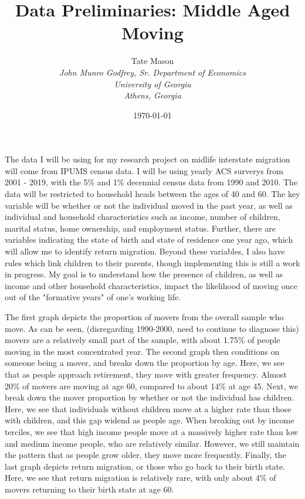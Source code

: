 \documentclass[11pt,a4paper]{article}
\title{Data Preliminaries: Middle Aged Moving}
\author{
    Tate Mason \\
    \textit{John Munro Godfrey, Sr. Department of Economics} \\
    \textit{University of Georgia} \\
    \textit{Athens, Georgia} \\
}
\date{\today}
\begin{document}
\maketitle
\thispagestyle{empty}

\newpage
\setcounter{page}{1}

The data I will be using for my research project on midlife interstate migration will come from IPUMS census data. I will be using yearly ACS surverys from 2001 - 2019, with the 5\% and 1\% decennial 
census data from 1990 and 2010. The data will be restricted to household heads between the ages of 40 and 60. The key variable will be whether or not the individual moved in the past year, as well as
individual and household characteristics such as income, number of children, marital status, home ownership, and employment status. Further, there are variables indicating the state of birth and state of residence one year ago, 
which will allow me to identify return migration. Beyond these variables, I also have rules which link children to their parents, though implementing this is still a work in progress. My goal is to
understand how the presence of children, as well as income and other household characteristics, impact the likelihood of moving once out of the "formative years" of one's working life.

The first graph depicts the proportion of movers from the overall sample who move. As can be seen, (disregarding 1990-2000, need to continue to diagnose this) movers are a relatively small part of the sample, with about 1.75\%
of people moving in the most concentrated year. The second graph then conditions on someone being a mover, and breaks down the proportion by age. Here, we see that as people approach retirement, they move with greater frequency.
Almost 20\% of movers are moving at age 60, compared to about 14\% at age 45. Next, we break down the mover proportion by whether or not the individual has children. Here, we see that individuals without children move at a higher rate than those with children, and this gap
widend as people age. When breaking out by income terciles, we see that high income people move at a massively higher rate than low and medium income people, who are relatively similar. However, we still maintain the pattern that
as people grow older, they move more frequently. Finally, the last graph depicts return migration, or those who go back to their birth state. Here, we see that return migration is relatively rare, with only about 4\% of movers returning to their birth state at age 60.
\end{document}
